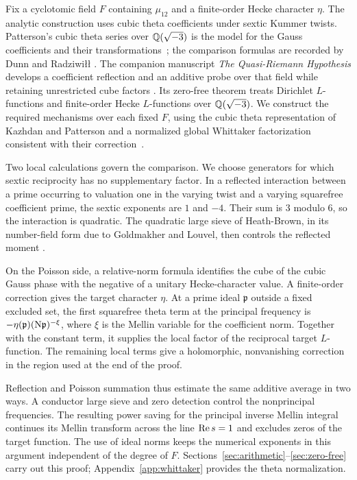 Fix a cyclotomic field $F$ containing $\mu_{12}$ and a finite-order
Hecke character $\eta$. The analytic construction uses cubic theta
coefficients under sextic Kummer twists. Patterson's cubic theta
series over $\mathbb{Q}(\sqrt{-3})$ is the model for the Gauss coefficients
and their transformations~\cite{Patterson77,Patterson77II}; the
comparison formulas are recorded by Dunn and Radziwi\l{}\l{}
\cite[Section~5.1 and Appendix~A]{DunnRadziwill24}.
The companion manuscript \emph{The Quasi-Riemann Hypothesis}
develops a coefficient reflection and an additive probe over that
field while retaining unrestricted cube factors
\cite[Part~I, Sections~5--7]{QuasiRH}. Its zero-free theorem treats
Dirichlet $L$-functions and finite-order Hecke $L$-functions over
$\mathbb{Q}(\sqrt{-3})$. We construct the required mechanisms over each
fixed $F$, using the cubic theta representation of Kazhdan and
Patterson and a normalized global Whittaker factorization consistent
with their correction~\cite{KP84,KP85Erratum}.

Two local calculations govern the comparison. We choose generators
for which sextic reciprocity has no supplementary factor. In a
reflected interaction between a prime occurring to valuation one
in the varying twist and a varying squarefree coefficient prime,
the sextic exponents are $1$ and $-4$. Their sum is $3$ modulo $6$,
so the interaction is quadratic. The quadratic large sieve of
Heath-Brown, in its number-field form due to Goldmakher and Louvel,
then controls the reflected moment
\cite{HeathBrown95,GoldmakherLouvel13}.

On the Poisson side, a relative-norm formula identifies the cube of
the cubic Gauss phase with the negative of a unitary Hecke-character
value. A finite-order correction gives the target character $\eta$.
At a prime ideal $\mathfrak p$ outside a fixed excluded set, the
first squarefree theta term at the principal frequency is
$-\eta(\mathfrak p)(\mathrm{N}\mathfrak p)^{-\xi}$, where $\xi$ is
the Mellin variable for the coefficient norm. Together with the
constant term, it supplies the local factor of the reciprocal
target $L$-function. The remaining local terms give a holomorphic,
nonvanishing correction in the region used at the end of the proof.

Reflection and Poisson summation thus estimate the same additive
average in two ways. A conductor large sieve and zero detection
control the nonprincipal frequencies. The resulting power saving
for the principal inverse Mellin integral continues its Mellin
transform across the line $\operatorname{Re} s=1$ and excludes zeros of the
target function. The use of ideal norms keeps the numerical
exponents in this argument independent of the degree of $F$.
Sections~\ref{sec:arithmetic}--\ref{sec:zero-free} carry out this
proof; Appendix~\ref{app:whittaker} provides the theta normalization.

